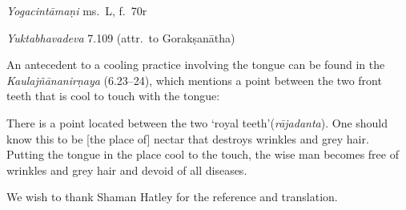 \begin{ekdosis}
\begin{testimonia}[hp02_059]
\begin{versinnote}
\tl{\var{°tṛṣāḥ ] °tṛṣā J,n1; °tṛṣaḥ T,t1}\\!}%
\end{versinnote}

\emph{Yogacintāmaṇi} ms.~L, f.~70r

\begin{versinnote}
\end{versinnote}

\emph{Yuktabhavadeva} 7.109 (attr.~to Gorakṣanātha)
\begin{versinnote}
\end{versinnote}

\end{testimonia}

\begin{philcomm}[hp02_059]
An antecedent to a cooling practice involving the tongue can be found in the \emph{Kaulajñānanirṇaya} (6.23–24), which mentions a point between the two front teeth that is cool to touch with the tongue:

\begin{versinnote}
There is a point located between the two ‘royal teeth’(\emph{rājadanta}). One should know this to be [the place of] nectar that destroys wrinkles and grey hair. Putting the tongue in the place cool to the touch, the wise man becomes free of wrinkles and grey hair and devoid of all diseases.
\end{versinnote}
We wish to thank Shaman Hatley for the reference and translation.
\end{philcomm}


\end{ekdosis}
